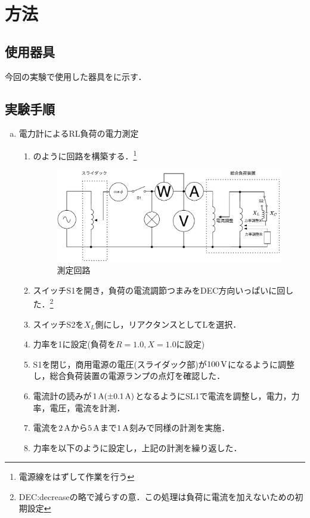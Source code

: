 \clearpage
\section{方法}
\subsection{使用器具}
今回の実験で使用した器具をに示す．

\subsection{実験手順}
\begin{enumerate}[a)]
\item 電力計によるRL負荷の電力測定
\label{RLhuka}
\begin{enumerate}[(1)]
	\item {}のように回路を構築する．\footnote{電源線をはずして作業を行う}
	\begin{figure}[h]
	\centering
	\includegraphics[scale=1]{./fig/circ.pdf}
	\caption{測定回路}
	\label{fig:circ}
\end{figure}
\item スイッチS1を開き，負荷の電流調節つまみをDEC方向いっぱいに回した．\footnote{DEC:decreaseの略で減らすの意．この処理は負荷に電流を加えないための初期設定}
\item スイッチS2を$X_{L}$側にし，リアクタンスとしてLを選択．\label{S2}
\item 力率を1に設定(負荷を$R=1.0, X=1.0$に設定)
\item S1を閉じ，商用電源の電圧(スライダック部)が$100\,\rm{V}$になるように調整し，総合負荷装置の電源ランプの点灯を確認した．
\item 電流計の読みが$1\,\rm{A}(\pm 0.1\,\rm{A})$となるようにSL1で電流を調整し，電力，力率，電圧，電流を計測．
\item 電流を$2\,\rm{A}$から$5\,\rm{A}$まで$1\,\rm{A}$刻みで同様の計測を実施．
\item 力率を以下のように設定し，上記の計測を繰り返した．

\end{enumerate}
\end{enumerate}
